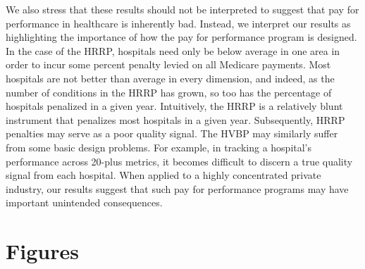 \documentclass[12pt]{article}
\begin{document}
We also stress that these results should not be interpreted to suggest that pay for performance in healthcare is inherently bad. Instead, we interpret our results as highlighting the importance of how the pay for performance program is designed. In the case of the HRRP, hospitals need only be below average in one area in order to incur some percent penalty levied on all Medicare payments. Most hospitals are not better than average in every dimension, and indeed, as the number of conditions in the HRRP has grown, so too has the percentage of hospitals penalized in a given year. Intuitively, the HRRP is a relatively blunt instrument that penalizes most hospitals in a given year. Subsequently, HRRP penalties may serve as a poor quality signal. The HVBP may similarly suffer from some basic design problems. For example, in tracking a hospital's performance across 20-plus metrics, it becomes difficult to discern a true quality signal from each hospital. When applied to a highly concentrated private industry, our results suggest that such pay for performance programs may have important unintended consequences.

\newpage




\clearpage
\newpage


\newsavebox{\gfxbox}
\newpage
\section*{Figures}
\end{document}
